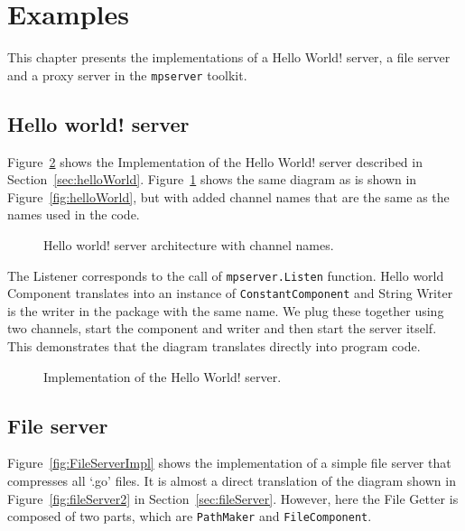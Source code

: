 \section{Examples}
\label{sec:examples}
This chapter presents the implementations of a Hello World! server,
a file server and a proxy server in the \texttt{mpserver} toolkit.

\subsection{Hello world! server}
Figure~\ref{fig:HelloWorldImpl} shows the Implementation of the Hello World!
server described in Section~\ref{sec:helloWorld}. Figure~\ref{fig:helloWorld2}
shows the same diagram as is shown in Figure~\ref{fig:helloWorld}, but with
added channel names that are the same as the names used in the code.

\begin{figure}[h]
\centering
{}
\caption[scale=1.0]{Hello world! server architecture with channel names.}
\label{fig:helloWorld2}
\end{figure}

The Listener corresponds to the call of \texttt{mpserver.Listen} function.
Hello world Component translates into an instance of \texttt{ConstantComponent}
and String Writer is the writer in the package with the same name.
We plug these together using two channels, start the component and writer 
and then start the server itself. This demonstrates that the diagram translates
directly into program code.

\begin{figure}[h]
\centering

\caption[scale=1.0]{Implementation of the Hello World! server.}
\label{fig:HelloWorldImpl}
\end{figure}

\newpage
\subsection{File server}
Figure~\ref{fig:FileServerImpl} shows the implementation of a simple 
file server that compresses all `.go' files. It is almost a direct translation
of the diagram shown in Figure~\ref{fig:fileServer2} in Section~\ref{sec:fileServer}.
However, here the File Getter is composed of two parts, which are \texttt{PathMaker}
and \texttt{FileComponent}.


